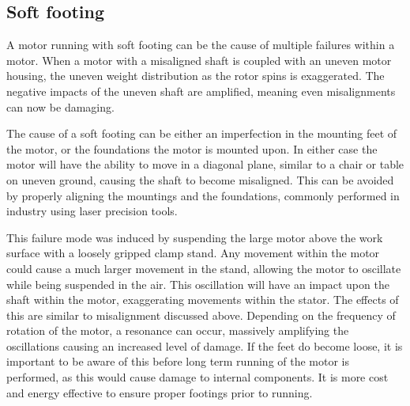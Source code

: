 \subsection{Soft footing}

A motor running with soft footing can be the cause of multiple failures within a motor. When a motor with a misaligned shaft is coupled with an uneven motor housing, the uneven weight distribution as the rotor spins is exaggerated. The negative impacts of the uneven shaft are amplified, meaning even misalignments can now be damaging. 

The cause of a soft footing can be either an imperfection in the mounting feet of the motor, or the foundations the motor is mounted upon. In either case the motor will have the ability to move in a diagonal plane, similar to a chair or table on uneven ground, causing the shaft to become misaligned. This can be avoided by properly aligning the mountings and the foundations, commonly performed in industry using laser precision tools. 

This failure mode was induced by suspending the large motor above the work surface with a loosely gripped clamp stand. Any movement within the motor could cause a much larger movement in the stand, allowing the motor to oscillate while being suspended in the air. This oscillation will have an impact upon the shaft within the motor, exaggerating movements within the stator. The effects of this are similar to misalignment discussed above. Depending on the frequency of rotation of the motor, a resonance can occur, massively amplifying the oscillations causing an increased level of damage. If the feet do become loose, it is important to be aware of this before long term running of the motor is performed, as this would cause damage to internal components. It is more cost and energy effective to ensure proper footings prior to running.
